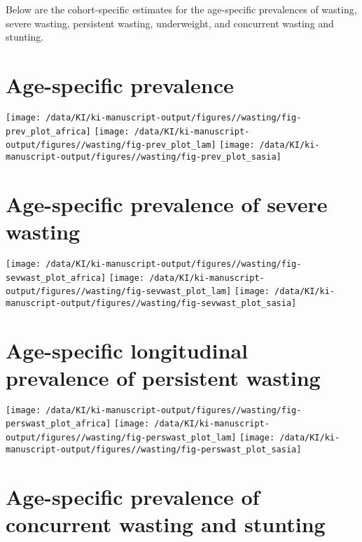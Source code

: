 \documentclass[
  9pt,
]{book}
\begin{document}
\raggedright

Below are the cohort-specific estimates for the age-specific prevalences of wasting, severe wasting, persistent wasting, underweight, and concurrent wasting and stunting.

\hypertarget{age-specific-prevalence-1}{%
\section{Age-specific prevalence}\label{age-specific-prevalence-1}}

\texttt{[image: /data/KI/ki-manuscript-output/figures//wasting/fig-prev\_plot\_africa]}
\texttt{[image: /data/KI/ki-manuscript-output/figures//wasting/fig-prev\_plot\_lam]}
\texttt{[image: /data/KI/ki-manuscript-output/figures//wasting/fig-prev\_plot\_sasia]}

\hypertarget{age-specific-prevalence-of-severe-wasting-1}{%
\section{Age-specific prevalence of severe wasting}\label{age-specific-prevalence-of-severe-wasting-1}}

\texttt{[image: /data/KI/ki-manuscript-output/figures//wasting/fig-sevwast\_plot\_africa]}
\texttt{[image: /data/KI/ki-manuscript-output/figures//wasting/fig-sevwast\_plot\_lam]}
\texttt{[image: /data/KI/ki-manuscript-output/figures//wasting/fig-sevwast\_plot\_sasia]}

\hypertarget{age-specific-longitudinal-prevalence-of-persistent-wasting-1}{%
\section{Age-specific longitudinal prevalence of persistent wasting}\label{age-specific-longitudinal-prevalence-of-persistent-wasting-1}}

\texttt{[image: /data/KI/ki-manuscript-output/figures//wasting/fig-perswast\_plot\_africa]}
\texttt{[image: /data/KI/ki-manuscript-output/figures//wasting/fig-perswast\_plot\_lam]}
\texttt{[image: /data/KI/ki-manuscript-output/figures//wasting/fig-perswast\_plot\_sasia]}

\hypertarget{age-specific-prevalence-of-concurrent-wasting-and-stunting-1}{%
\section{Age-specific prevalence of concurrent wasting and stunting}\label{age-specific-prevalence-of-concurrent-wasting-and-stunting-1}}
\end{document}
